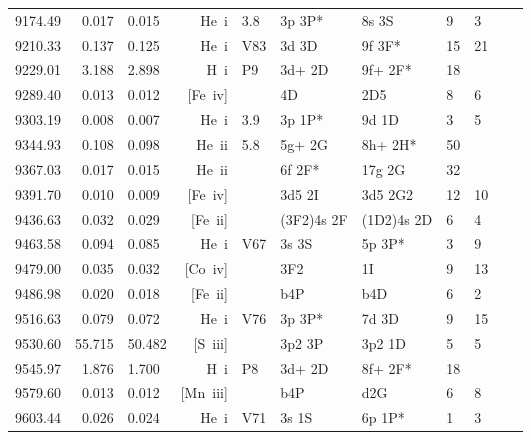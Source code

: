 \begin{longtable}{lrlrlllllll}
 9174.49 &   0.017 &   0.015 & He~{\sc i}       & 3.8        & 3p  3P*    & 8s  3S     &          9 &        3    \\
 9210.33 &   0.137 &   0.125 & He~{\sc i}       & V83        & 3d  3D     & 9f  3F*    &         15 &       21    \\
 9229.01 &   3.188 &   2.898 & H~{\sc i}        & P9         & 3d+ 2D     & 9f+ 2F*    &         18 &             \\
 9289.40 &   0.013 &   0.012 & [Fe~{\sc iv}]    &            & 4D         & 2D5        &          8 &        6    \\
 9303.19 &   0.008 &   0.007 & He~{\sc i}       & 3.9        & 3p  1P*    & 9d  1D     &          3 &        5    \\
 9344.93 &   0.108 &   0.098 & He~{\sc ii}      & 5.8        & 5g+ 2G     & 8h+ 2H*    &         50 &             \\
 9367.03 &   0.017 &   0.015 & He~{\sc ii}      &            & 6f  2F*    & 17g  2G    &         32 &             \\
 9391.70 &   0.010 &   0.009 & [Fe~{\sc iv}]    &            & 3d5 2I     & 3d5 2G2    &         12 &       10    \\
 9436.63 &   0.032 &   0.029 & [Fe~{\sc ii}]    &            & (3F2)4s 2F & (1D2)4s 2D &          6 &        4    \\
 9463.58 &   0.094 &   0.085 & He~{\sc i}       & V67        & 3s  3S     & 5p  3P*    &          3 &        9    \\
 9479.00 &   0.035 &   0.032 & [Co~{\sc iv}]    &            & 3F2        & 1I         &          9 &       13    \\
 9486.98 &   0.020 &   0.018 & [Fe~{\sc ii}]    &            & b4P        & b4D        &          6 &        2    \\
 9516.63 &   0.079 &   0.072 & He~{\sc i}       & V76        & 3p  3P*    & 7d  3D     &          9 &       15    \\
 9530.60 &  55.715 &  50.482 & [S~{\sc iii}]    &            & 3p2 3P     & 3p2 1D     &          5 &        5    \\
 9545.97 &   1.876 &   1.700 & H~{\sc i}        & P8         & 3d+ 2D     & 8f+ 2F*    &         18 &             \\
 9579.60 &   0.013 &   0.012 & [Mn~{\sc iii}]   &            & b4P        & d2G        &          6 &        8    \\
 9603.44 &   0.026 &   0.024 & He~{\sc i}       & V71        & 3s  1S     & 6p  1P*    &          1 &        3    \\

\end{longtable}
